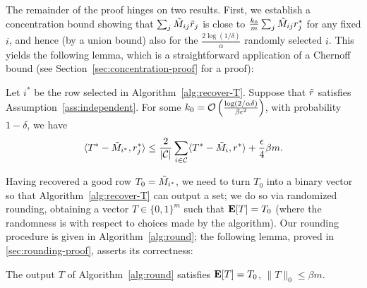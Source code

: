 The remainder of the proof hinges on two results. First, we establish 
a concentration bound showing that $\sum_j \tilde{M}_{ij}\tilde{r}_j$ is close to 
$\frac{k_0}{m}\sum_j \tilde{M}_{ij}r^*_j$ for any fixed $i$, and hence (by a union bound) 
also for the $\frac{2\log(1/\delta)}{\alpha}$ randomly selected $i$. 
This yields the following lemma, which is a straightforward 
application of a Chernoff bound (see Section~\ref{sec:concentration-proof} for a proof):
\begin{lemma}
\label{lem:robs-rtrue}
Let $i^*$ be the row selected in Algorithm~\ref{alg:recover-T}. 
Suppose that $\tilde{r}$ satisfies Assumption~\ref{ass:independent}. 
For some 
$k_0 = \mathcal{O}\left( \frac{\log(2/\alpha\delta)}{\beta\epsilon^2} \right)$, 
with probability $1-\delta$, we have
\begin{equation}
\label{eq:robs-rtrue}
\langle T^*-\tilde{M}_{i^*}, r^*_j \rangle \leq \frac{2}{|\mathcal{C}|} \sum_{i \in \mathcal{C}} \langle T^* - \tilde{M}_i, r^* \rangle + \frac{\epsilon}{4}\beta m.
\end{equation}
\end{lemma}

Having recovered a good row $T_0 = \tilde{M}_{i^*}$, 
we need to turn $T_0$ into a binary vector so that 
Algorithm~\ref{alg:recover-T} can output a set;
we do so via randomized rounding, obtaining a vector $T \in \{0,1\}^m$ such that 
$\mathbf{E}[T] = T_0$ (where the randomness is with respect to choices made by the algorithm).
Our rounding procedure is given in Algorithm~\ref{alg:round}; the following 
lemma, proved in \ref{sec:rounding-proof}, asserts its correctness:
\begin{lemma}
\label{lem:rounding}
The output $T$ of Algorithm~\ref{alg:round} satisfies $\mathbf{E}[T] = T_0$, 
$\|T\|_0 \leq \beta m$.
\end{lemma}




